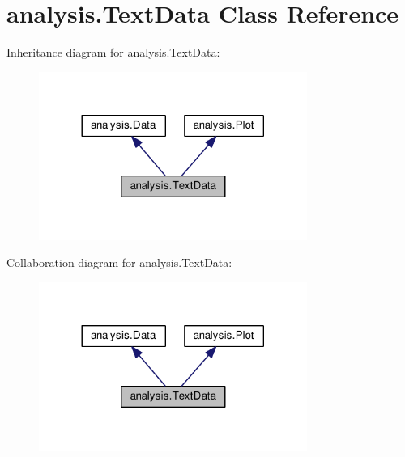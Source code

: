 \hypertarget{classanalysis_1_1TextData}{}\section{analysis.\+Text\+Data Class Reference}
\label{classanalysis_1_1TextData}


Inheritance diagram for analysis.\+Text\+Data\+:
\nopagebreak
\begin{figure}[H]
\begin{center}
\leavevmode
\includegraphics[width=248pt]{classanalysis_1_1TextData__inherit__graph}
\end{center}
\end{figure}


Collaboration diagram for analysis.\+Text\+Data\+:
\nopagebreak
\begin{figure}[H]
\begin{center}
\leavevmode
\includegraphics[width=248pt]{classanalysis_1_1TextData__coll__graph}
\end{center}
\end{figure}
